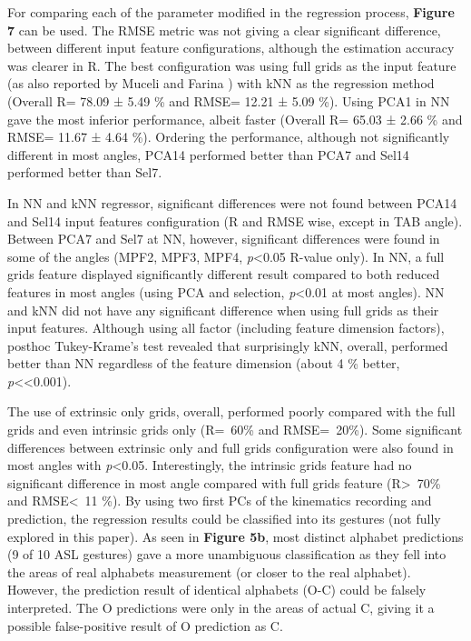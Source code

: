 \documentclass[conference]{IEEEtran}
\begin{document}
For comparing each of the parameter modified in the regression process, \textbf{Figure 7} can be used. The 
RMSE metric was not giving a clear significant difference, between different input feature configurations, 
although the estimation accuracy was clearer in R. The best configuration was using full grids as the input 
feature (as also reported by Muceli and Farina \cite{b9}) with kNN as the regression method (Overall R= 78.09 ± 
5.49 \% and RMSE= 12.21 ± 5.09 \%). Using PCA1 in NN gave the most inferior performance, albeit faster 
(Overall R= 65.03 ± 2.66 \% and RMSE= 11.67 ± 4.64 \%). Ordering the performance, although not 
significantly different in most angles, PCA14 performed better than PCA7 and Sel14 performed better than 
Sel7.

In NN and kNN regressor, significant differences were not found between PCA14 and Sel14 input 
features configuration (R and RMSE wise, except in TAB angle). Between PCA7 and Sel7 at NN, however, 
significant differences were found in some of the angles (MPF2, MPF3, MPF4, \textit{p}<0.05 R-value only). In 
NN, a full grids feature displayed significantly different result compared to both reduced features in most 
angles (using PCA and selection, \textit{p}<0.01 at most angles). NN and kNN did not have any significant 
difference when using full grids as their input features. Although using all factor (including feature 
dimension factors), posthoc Tukey-Krame’s test revealed that surprisingly kNN, overall, performed better 
than NN regardless of the feature dimension (about 4 \% better, \textit{p}<<0.001).

The use of extrinsic only grids, overall, performed poorly compared with the full grids and even 
intrinsic grids only (R=~60\% and RMSE=~20\%). Some significant differences between extrinsic only and 
full grids configuration were also found in most angles with \textit{p}<0.05. Interestingly, the intrinsic grids feature 
had no significant difference in most angle compared with full grids feature (R>~70\% and RMSE<~11 \%). 
By using two first PCs of the kinematics recording and prediction, the regression results could be 
classified into its gestures (not fully explored in this paper). As seen in \textbf{Figure 5b}, most distinct alphabet 
predictions (9 of 10 ASL gestures) gave a more unambiguous classification as they fell into the areas of real 
alphabets measurement (or closer to the real alphabet). However, the prediction result of identical alphabets 
(O-C) could be falsely interpreted. The O predictions were only in the areas of actual C, giving it a possible 
false-positive result of O prediction as C.
\end{document}
